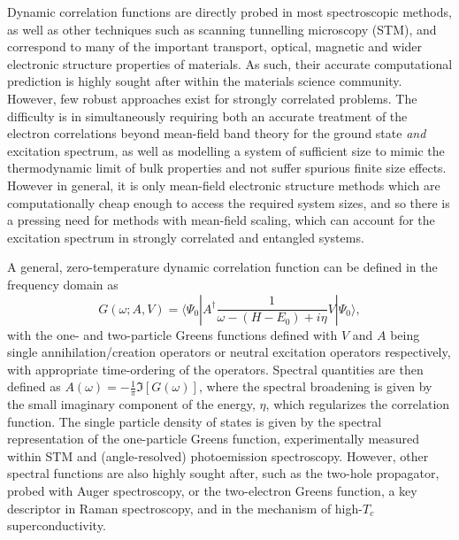 \documentclass[aps,showpacs,twocolumn,nobibnotes]{revtex4}
\begin{document}
Dynamic correlation functions are directly probed in most spectroscopic methods, as well as other techniques such as scanning tunnelling microscopy (STM), 
and correspond to many of the important transport, optical, magnetic and wider electronic structure properties of materials. 
As such, their accurate computational prediction is highly sought after within the materials science community. 
However, few robust approaches exist for strongly correlated problems\cite{Gali2013}. The difficulty is in simultaneously requiring both an accurate 
treatment of the electron correlations beyond mean-field band theory for the ground state {\em and} excitation spectrum, as well as modelling 
a system of sufficient size to mimic the thermodynamic limit of bulk properties and not suffer spurious finite size effects. 
However in general, it is only mean-field electronic structure methods which are computationally cheap enough to access the required system
sizes, and so there is a pressing need for methods with mean-field scaling, which can account for the excitation spectrum in strongly correlated 
and entangled systems.

A general, zero-temperature dynamic correlation function can be defined in the frequency domain as
\begin{equation}
    G(\omega;A,V) = \langle \Psi_0 | A^{\dagger} \frac{1}{\omega-(H-E_0)+i \eta} V | \Psi_0 \rangle , \label{eqn:intCorrFunc}
\end{equation}
with the one- and two-particle Greens functions defined with $V$ and $A$ being single annihilation/creation operators or neutral excitation
operators respectively, with appropriate time-ordering of the operators. Spectral quantities are then defined as $A(\omega)=-\frac{1}{\pi}\Im[G(\omega)]$,
where the spectral broadening is given by the small imaginary component of the energy, $\eta$, which regularizes the correlation function. The single particle
density of states is given by the spectral representation of the one-particle Greens function, experimentally measured within STM and (angle-resolved) photoemission
spectroscopy. However, other spectral functions are also highly sought after, such as the two-hole propagator, probed with Auger spectroscopy\cite{Mona2013}, or the two-electron
Greens function, a key descriptor in Raman spectroscopy, and in the mechanism of high-$T_c$ superconductivity\cite{Millis2012,Millis2013}.
\end{document}
